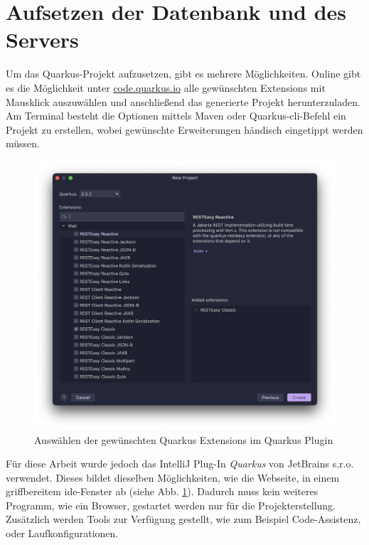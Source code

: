 \section{Aufsetzen der Datenbank und des Servers}

Um das Quarkus-Projekt aufzusetzen, gibt es mehrere Möglichkeiten. 
Online gibt es die Möglichkeit unter \href{https://code.quarkus.io}{code.quarkus.io} alle gewünschten Extensions mit Mausklick auszuwählen und anschließend das generierte Projekt herunterzuladen. 
Am Terminal besteht die Optionen mittels Maven oder Quarkus-\gls{cli}-Befehl ein Projekt zu erstellen, wobei gewünschte Erweiterungen händisch eingetippt werden müssen.

\begin{figure}
    \centering
    \includegraphics[scale=0.35]{pics/quarkusplugin.png}
    \caption{Auswählen der gewünschten Quarkus Extensions im Quarkus Plugin}
    \label{fig:intellij:plugin}
\end{figure}

Für diese Arbeit wurde jedoch das IntelliJ Plug-In \emph{Quarkus} von JetBrains s.r.o. verwendet. 
Dieses bildet dieselben Möglichkeiten, wie die Webseite, in einem griffbereitem \gls{ide}-Fenster ab (siehe Abb. \ref{fig:intellij:plugin}).
Dadurch muss kein weiteres Programm, wie ein Browser, gestartet werden nur für die Projekterstellung.
Zusätzlich werden Tools zur Verfügung gestellt, wie zum Beispiel Code-Assistenz, oder Laufkonfigurationen. \cite{QuarkusPlugin}

